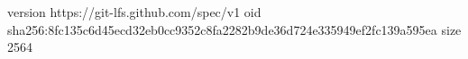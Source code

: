 version https://git-lfs.github.com/spec/v1
oid sha256:8fc135c6d45ecd32eb0cc9352c8fa2282b9de36d724e335949ef2fc139a595ea
size 2564
